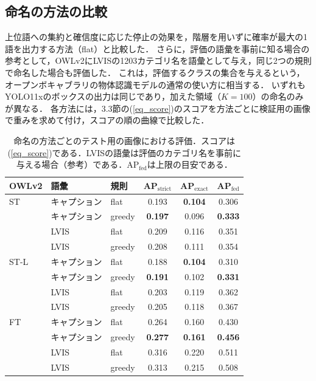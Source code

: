 \subsection{命名の方法の比較}
上位語への集約と確信度に応じた停止の効果を，階層を用いずに確率が最大の1語を出力する方法（flat）と比較した．
さらに，評価の語彙を事前に知る場合の参考として，OWLv2にLVISの1203カテゴリ名を語彙として与え，同じ2つの規則で命名した場合も評価した．
これは，評価するクラスの集合を与えるという，オープンボキャブラリの物体認識モデルの通常の使い方に相当する．
いずれもYOLO11xのボックスの出力は同じであり，加えた領域（$ K = 100 $）の命名のみが異なる．
各方法には，3.3節の(\ref{eq_score})のスコアを方法ごとに検証用の画像で重みを求めて付け，スコアの順の曲線で比較した．

\begin{table}[t]
    \vspace{3mm}
    \centering
    \caption{命名の方法ごとのテスト用の画像における評価．スコアは(\ref{eq_score})である．LVISの語彙は評価のカテゴリ名を事前に与える場合（参考）である．AP$ _{\mathrm{fed}} $は上限の目安である．}
    \label{tab_baseline}
    \footnotesize
    \setlength{\tabcolsep}{3pt}
    \begin{tabular}{lllccc}
        \toprule
        OWLv2 & 語彙 & 規則 & AP$ _{\mathrm{strict}} $ & AP$ _{\mathrm{exact}} $ & AP$ _{\mathrm{fed}} $ \\
        \midrule
        ST & キャプション & flat & 0.193 & {\bf 0.104} & 0.306 \\
         & キャプション & greedy & {\bf 0.197} & 0.096 & {\bf 0.333} \\
         & LVIS & flat & 0.209 & 0.116 & 0.351 \\
         & LVIS & greedy & 0.208 & 0.111 & 0.354 \\
        \midrule
        ST-L & キャプション & flat & 0.188 & {\bf 0.104} & 0.310 \\
         & キャプション & greedy & {\bf 0.191} & 0.102 & {\bf 0.331} \\
         & LVIS & flat & 0.203 & 0.119 & 0.362 \\
         & LVIS & greedy & 0.205 & 0.118 & 0.367 \\
        \midrule
        FT & キャプション & flat & 0.264 & 0.160 & 0.430 \\
         & キャプション & greedy & {\bf 0.277} & {\bf 0.161} & {\bf 0.456} \\
         & LVIS & flat & 0.316 & 0.220 & 0.511 \\
         & LVIS & greedy & 0.313 & 0.215 & 0.508 \\
        \bottomrule
    \end{tabular}
\end{table}


